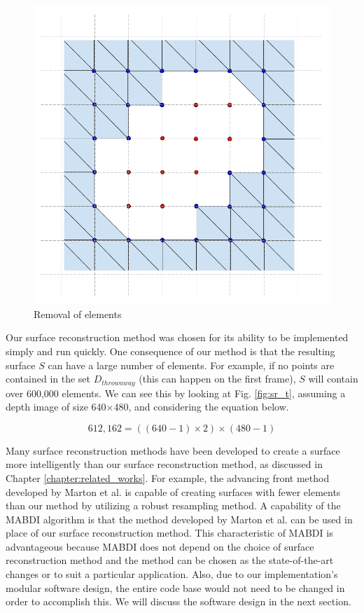 \begin{figure}[h]%
\centering
  \includegraphics[width=.70\textwidth]{figures/diagram_sr_element_removal.png}
  \caption{Removal of elements}
  \label{fig:sr_em}
\end{figure}

Our surface reconstruction method was chosen for its ability to be implemented
simply and run quickly. One consequence of our method is that the resulting
surface $S$ can have a large number of elements. For example, if no points are
contained in the set $D_{throwaway}$ (this can happen on the first frame), $S$
will contain over 600,000 elements. We can see this by looking at Fig.
\ref{fig:sr_t}, assuming a depth image of size 640$\times$480, and considering
the equation below.

\begin{equation}
  612,162 = ((640-1)\times2)\times(480-1)
\end{equation}

Many surface reconstruction methods have been developed to create a surface more
intelligently than our surface reconstruction method, as discussed in Chapter
\ref{chapter:related_works}. For example, the advancing front method developed
by Marton et al. \cite{Marton2009} is capable of creating surfaces with fewer
elements than our method by utilizing a robust resampling method. A capability
of the MABDI algorithm is that the method developed by Marton et al. can be used
in place of our surface reconstruction method. This characteristic of MABDI is
advantageous because MABDI does not depend on the choice of surface
reconstruction method and the method can be chosen as the state-of-the-art
changes or to suit a particular application. Also, due to our implementation's
modular software design, the entire code base would not need to be changed in
order to accomplish this. We will discuss the software design in the next
section.

